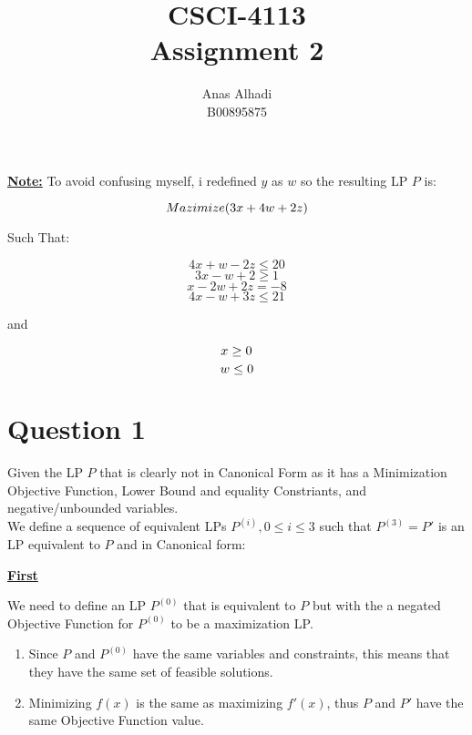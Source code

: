 \documentclass{article}
\title{\textbf{CSCI-4113\\Assignment 2}}
\author{Anas Alhadi\\B00895875}
\numberwithin{equation}{subsection}
\begin{document}
	\maketitle
	\tableofcontents

	\newpage 

	\par{
	 	\textbf{\underline{Note:}} To avoid confusing myself, i redefined $y$ as $w$ 
		so the resulting LP $P$ is:
	}


	\begin{equation}\notag
		Mazimize(3x+4w+2z)
	\end{equation}

	Such That:

	\begin{equation}\label{q1-1}\tag{1}
		4x+w-2z \leq 20
	\end{equation}
	\begin{equation}\tag{2}
		3x - w +2 \ge 1 
	\end{equation}
	\begin{equation}\label{q1-3}\tag{3}
		x-2w+2z = -8
	\end{equation}
	\begin{equation}\tag{4}
		4x-w+3z \leq 21
	\end{equation}

	and
	
	\begin{equation}\notag
		x\ge 0
	\end{equation}
	\begin{equation}\notag
		w \le 0
	\end{equation}

	\newpage
	\section{Question 1}
	\par{Given the LP $P$ that is clearly not in Canonical Form as it has a 
	Minimization Objective Function, Lower Bound and equality Constriants, and negative/unbounded variables.\\We define a 
	sequence of equivalent LPs $P^{(i)}, 0\leq i\leq3$ such that $P^{(3)}=P'$ is an 
	LP equivalent to $P$ and in Canonical form:}


	\vspace{15pt}
	\textbf{\underline{First}}
	\par{
		We need to define an LP $P^{(0)}$ that is equivalent to $P$ but with the a negated
		Objective Function for $P^{(0)}$ to be a maximization LP. 
	}
	\begin{enumerate}
		\item Since $P$ and $P^{(0)}$ have the same variables and constraints, 
			this means that they have the same set of feasible solutions.
		\item Minimizing $f(x)$ is the same as maximizing $f'(x)$, thus $P$ and 
			$P'$ have the same Objective Function value.
	\end{enumerate}
\end{document}

